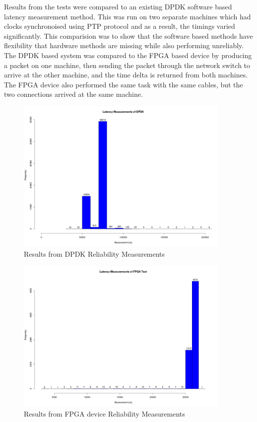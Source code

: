 \par Results from the tests were compared to an existing DPDK software based latency measurement method. This was 
run on two separate machines which had clocks synchronoised using PTP protocol and as a result, the timings varied 
significantly. This comparision was to show that the software based methods have flexibility that hardware methods
are missing while also performing unreliably. The DPDK based system was compared to the FPGA based device by producing
a packet on one machine, then sending the packet through the network switch to arrive at the other machine, and the
time delta is returned from both machines. The FPGA device also performed the same task with the same cables, but 
the two connections arrived at the same machine.

\begin{figure}[H]
    \begin{center}
        \includegraphics[keepaspectratio,height=7.5cm]{Images/DPDK}
        \caption{Results from DPDK Reliability Measurements}
        \label{fig:DPDKReliability}
    \end{center}
\end{figure}

\begin{figure}[H]
    \begin{center}
        \includegraphics[keepaspectratio,height=7.5cm]{Images/Test1Plot}
        \caption{Results from FPGA device Reliability Measurements}
        \label{fig:Test2Plot}
    \end{center}
\end{figure}

